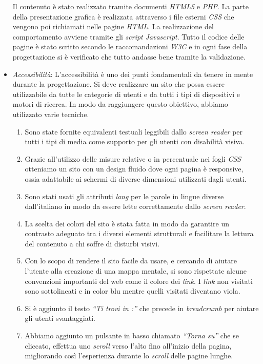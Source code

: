 \begin{itemize}
		Il contenuto è stato realizzato tramite documenti \textit{HTML5} e \textit{PHP}. La parte della presentazione grafica è realizzata attraverso i file esterni \textit{CSS} che vengono poi richiamati nelle pagine \textit{HTML}. La realizzazione del comportamento avviene tramite gli \textit{script} \textit{Javascript}. Tutto il codice delle pagine è stato scritto secondo le raccomandazioni \textit{W3C} e in ogni fase della progettazione si è verificato che tutto andasse bene tramite la validazione.
	\item \textit{Accessibilità}: L’accessibilità è uno dei punti fondamentali da tenere in mente durante la progettazione. Si deve realizzare un sito che possa essere utilizzabile da tutte le categorie di utenti e da tutti i tipi di dispositivi e motori di ricerca. In modo da raggiungere questo obiettivo, abbiamo utilizzato varie tecniche.
		\begin{enumerate}
			\item Sono state fornite equivalenti testuali leggibili dallo \textit{screen reader} per tutti i tipi di media come supporto per gli utenti con disabilità visiva.
			\item Grazie all’utilizzo delle misure relative o in percentuale nei fogli \textit{CSS} otteniamo un sito con un design fluido dove ogni pagina è responsive, ossia adattabile ai schermi di diverse dimensioni utilizzati dagli utenti.
			\item Sono stati usati gli attributi \textit{lang} per le parole in lingue diverse dall’italiano in modo da essere lette correttamente dallo \textit{screen reader}.
			\item La scelta dei colori del sito è stata fatta in modo da garantire un contrasto adeguato tra i diversi elementi strutturali e facilitare la lettura del contenuto a chi soffre di disturbi visivi.
			\item Con lo scopo di rendere il sito facile da usare, e cercando di aiutare l’utente alla creazione di una mappa mentale, si sono rispettate alcune convenzioni importanti del web come il colore dei \textit{link}. I \textit{link} non visitati sono sottolineati e in color blu mentre quelli visitati diventano viola.
			\item Si è aggiunto il testo \textit{“Ti trovi in :”} che precede in \textit{breadcrumb} per aiutare gli utenti svantaggiati.
			\item Abbiamo aggiunto un pulsante in basso chiamato \textit{“Torna su”} che se cliccato, effettua uno \textit{scroll} verso l’alto fino all’inizio della pagina, migliorando così l’esperienza durante lo \textit{scroll} delle pagine lunghe.

\end{enumerate}
\end{itemize}
